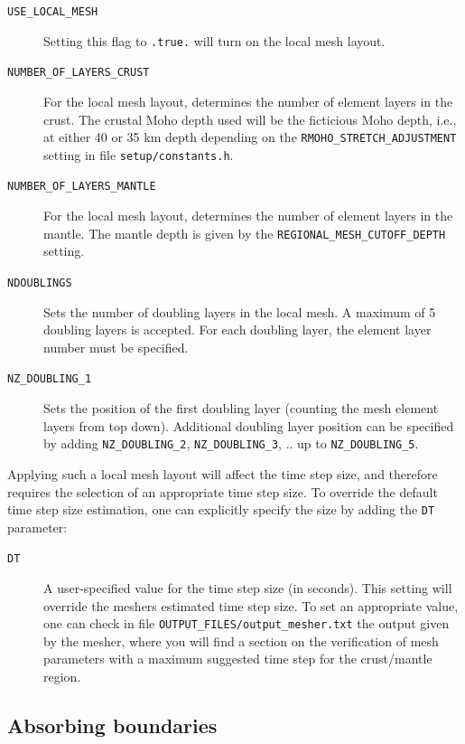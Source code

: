 \begin{description}
%
\item [{\texttt{USE\_LOCAL\_MESH}}] Setting this flag to \texttt{.true.} will turn on the local mesh layout.
%
\item [{\texttt{NUMBER\_OF\_LAYERS\_CRUST}}] For the local mesh layout, determines the number of element layers in the crust. The crustal Moho depth used will be the ficticious Moho depth, i.e., at either 40 or 35 km depth depending on the \texttt{RMOHO\_STRETCH\_ADJUSTMENT} setting in file \texttt{setup/constants.h}.
%
\item [{\texttt{NUMBER\_OF\_LAYERS\_MANTLE}}] For the local mesh layout, determines the number of element layers in the mantle. The mantle depth is given by the \texttt{REGIONAL\_MESH\_CUTOFF\_DEPTH} setting.
%
\item [{\texttt{NDOUBLINGS}}] Sets the number of doubling layers in the local mesh. A maximum of 5 doubling layers is accepted. For each doubling layer, the element layer number must be specified.
%
\item [{\texttt{NZ\_DOUBLING\_1}}] Sets the position of the first doubling layer (counting the mesh element layers from top down). Additional doubling layer position can be specified by adding \texttt{NZ\_DOUBLING\_2}, \texttt{NZ\_DOUBLING\_3}, .. up to \texttt{NZ\_DOUBLING\_5}.
%
\end{description}

Applying such a local mesh layout will affect the time step size, and therefore requires the selection of an appropriate time step size. To override the default time step size estimation, one can explicitly specify the size by adding the \texttt{DT} parameter:
\begin{description}
%
\item [{\texttt{DT}}] A user-specified value for the time step size (in seconds). This setting will override the meshers estimated time step size. To set an appropriate value, one can check in file \texttt{OUTPUT\_FILES/output\_mesher.txt} the output given by the mesher, where you will find a section on the verification of mesh parameters with a maximum suggested time step for the crust/mantle region.
%
\end{description}




\subsection{Absorbing boundaries}\label{sec:Absorbing-boundaries}


